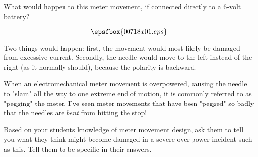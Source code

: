

What would happen to this meter movement, if connected directly to a 6-volt battery?

$$\epsfbox{00718x01.eps}$$







Two things would happen: first, the movement would most likely be damaged from excessive current.  Secondly, the needle would move to the left instead of the right (as it normally should), because the polarity is backward.







When an electromechanical meter movement is overpowered, causing the needle to "slam" all the way to one extreme end of motion, it is commonly referred to as "pegging" the meter.  I've seen meter movements that have been "pegged" so badly that the needles are {\it bent} from hitting the stop!

Based on your students knowledge of meter movement design, ask them to tell you what they think might become damaged in a severe over-power incident such as this.  Tell them to be specific in their answers.




